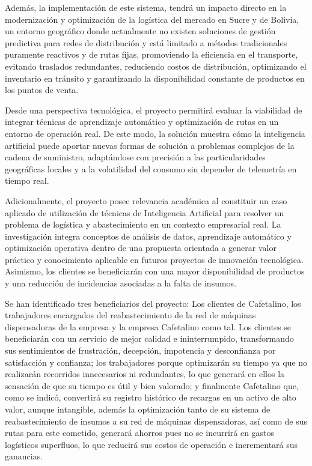 Además, la implementación de este sistema, tendrá un impacto directo en la modernización y optimización de la logística del mercado en Sucre y de Bolivia, un entorno geográfico donde actualmente no existen soluciones de gestión predictiva para redes de distribución y está limitado a métodos tradicionales puramente reactivos y de rutas fijas, promoviendo la eficiencia en el transporte, evitando traslados redundantes, reduciendo costos de distribución, optimizando el inventario en tránsito y garantizando la disponibilidad constante de productos en los puntos de venta.

Desde una perspectiva tecnológica, el proyecto permitirá evaluar la viabilidad de integrar técnicas de aprendizaje automático y optimización de rutas en un entorno de operación real. De este modo, la solución muestra cómo la inteligencia artificial puede aportar nuevas formas de solución a problemas complejos de la cadena de suministro, adaptándose con precisión a las particularidades geográficas locales y a la volatilidad del consumo sin depender de telemetría en tiempo real.

Adicionalmente, el proyecto posee relevancia académica al constituir un caso aplicado de utilización de técnicas de Inteligencia Artificial para resolver un problema de logística y abastecimiento en un contexto empresarial real. La investigación integra conceptos de análisis de datos, aprendizaje automático y optimización operativa dentro de una propuesta orientada a generar valor práctico y conocimiento aplicable en futuros proyectos de innovación tecnológica. Asimismo, los clientes se beneficiarán con una mayor disponibilidad de productos y una reducción de incidencias asociadas a la falta de insumos.

Se han identificado tres beneficiarios del proyecto: Los clientes de Cafetalino, los trabajadores encargados del reabastecimiento de la red de máquinas dispensadoras de la empresa y la empresa Cafetalino como tal. Los clientes se beneficiarán con un servicio de mejor calidad e ininterrumpido, transformando sus sentimientos de frustración, decepción, impotencia y desconfianza por satisfacción y confianza; los trabajadores porque optimizarán su tiempo ya que no realizarán recorridos innecesarios ni redundantes, lo que generará en ellos la sensación de que su tiempo es útil y bien valorado; y finalmente Cafetalino que, como se indicó, convertirá su registro histórico de recargas en un activo de alto valor, aunque intangible, además la optimización tanto de su sistema de reabastecimiento de insumos a su red de máquinas dispensadoras, así como de sus rutas para este cometido, generará ahorros pues no se incurrirá en gastos logísticos superfluos, lo que reducirá sus costos de operación e incrementará sus ganancias.

